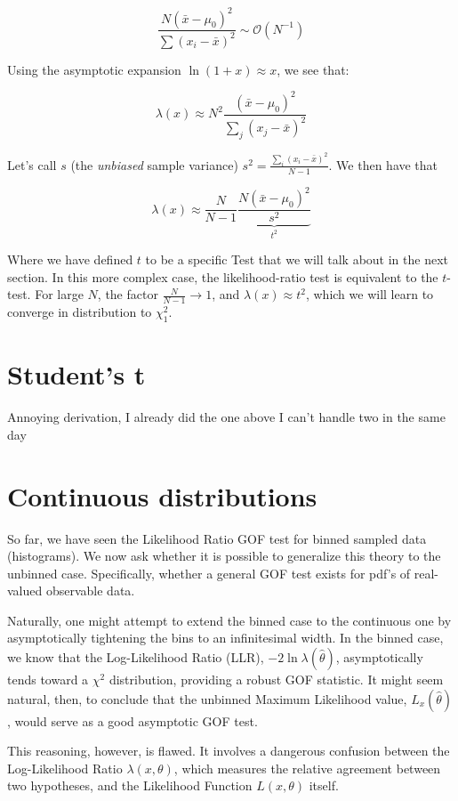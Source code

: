 	\[
	\frac{N(\bar{x} - \mu_0)^2}{\sum (x_i - \bar{x})^2} \sim \mathcal{O}\left(N^{-1}\right)
	\]

Using the asymptotic expansion $\ln(1+x) \approx x$, we see that:

	\[
	\lambda(x) \approx N^2\frac{\left(\bar{x}-\mu_0\right)^2}{\sum_j\left(x_j-\bar{x}\right)^2}
	\]

Let's call $s$ (the \emph{unbiased} sample variance) $s^2 = \frac{\sum_i\left(x_i-\bar{x}\right)^2}{N-1}$. We then have that

	\[
	\lambda(x) \approx \frac{N}{N-1}\underbrace{\frac{N\left(\bar{x}-\mu_0\right)^2}{s^2}}_{t^2}
	\]

Where we have defined $t$ to be a specific Test that we will talk about in the next section. In this more complex case, the likelihood-ratio test is equivalent to the $t$-test. For large $N$, the factor $\frac{N}{N-1} \to 1$, and $\lambda(x)\approx t^2$, which we will learn to converge in distribution to $\chi^2_1$.

\section{Student's t}
Annoying derivation, I already did the one above I can't handle two in the same day
\section{Continuous distributions}

So far, we have seen the Likelihood Ratio GOF test for binned sampled data (histograms). We now ask whether it is possible to generalize this theory to the unbinned case. Specifically, whether a general GOF test exists for pdf's of real-valued observable data. 

Naturally, one might attempt to extend the binned case to the continuous one by asymptotically tightening the bins to an infinitesimal width. In the binned case, we know that the Log-Likelihood Ratio (LLR), $-2\ln \lambda(\hat{\theta})$, asymptotically tends toward a $\chi^2$ distribution, providing a robust GOF statistic. It might seem natural, then, to conclude that the unbinned Maximum Likelihood value, $L_x(\hat{\theta})$, would serve as a good asymptotic GOF test.

This reasoning, however, is flawed. It involves a dangerous confusion between the Log-Likelihood Ratio $\lambda(x, \theta)$, which measures the relative agreement between two hypotheses, and the Likelihood Function $L(x, \theta)$ itself. 

